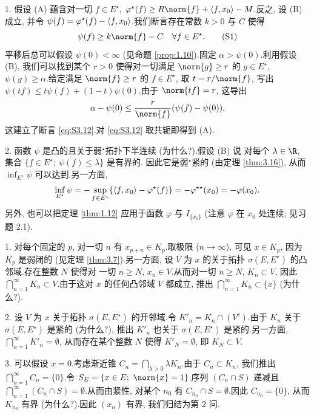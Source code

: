 
1. 假设 (A) 蕴含对一切 $f\in E^\star$,
$\varphi^\star(f)\ge R\norm{f}+\dual{f}{x_0}-M$.反之, 设 (B) 成立, 并令
$\psi(f)=\varphi^\star(f)-\left\langle f,x_0\right\rangle$.我们断言存在常数 $k>0$ 与 $C$ 使得
\begin{equation}
\psi(f)\ge k\norm{f}-C\quad\forall f\in E^\star.
\tag{S1}
\label{eq:S3.12}
\end{equation}
平移后总可以假设 $\psi(0)<\infty$ (见命题  \ref{prop:1.10}).固定
$\alpha>\psi(0)$.利用假设 (B), 我们可以找到某个 $r>0$ 使得对一切满足
$\norm{g}\ge r$ 的 $g\in E^\star$, $\psi(g)\ge\alpha$.给定满足
$\norm{f}\ge r$ 的 $f\in E^\star$, 取 $t=r/\norm{f}$, 写出
$\psi(tf)\le t\psi(f)+(1-t)\psi(0)$.由于 $\norm{tf}=r$, 这导出
\begin{equation*}
\alpha-\psi(0)\le\frac{r}{\norm{f}}(\psi(f)-\psi(0)),
\end{equation*}
这建立了断言 \eqref{eq:S3.12}.对 \eqref{eq:S3.12} 取共轭即得到 (A).

2. 函数 $\psi$ 是凸的且关于弱$^\star$拓扑下半连续 (为什么?).假设 (B) 说
对每个 $\lambda\in\R$, 集合 $\{f\in E^\star;\ \psi(f)\le\lambda\}$ 是有界的.
因此它是弱$^\star$紧的 (由定理  \ref{thm:3.16}), 从而 $\inf_{E^\star}\psi$
可以达到.另一方面,
\begin{equation*}
\inf_{E^\star}\psi=-\sup_{f\in E^\star}\{\left\langle f,x_0\right\rangle-\varphi^\star(f)\}
=-\varphi^{\star\star}(x_0)=-\varphi(x_0).
\end{equation*}
另外, 也可以把定理  \ref{thm:1.12} 应用于函数 $\varphi$ 与 $I_{\{x_0\}}$
(注意 $\varphi$ 在 $x_0$ 处连续; 见习题 2.1).


1. 对每个固定的 $p$, 对一切 $n$ 有 $x_{p+n}\in K_p$.取极限 ($n\to\infty$),
可见 $x\in K_p$, 因为 $K_p$ 是弱闭的 (见定理  \ref{thm:3.7}).另一方面, 设
$V$ 为 $x$ 的关于拓扑 $\sigma(E,E^\star)$ 的凸邻域.存在整数 $N$ 使得对
一切 $n\ge N$, $x_n\in V$.从而对一切 $n\ge N$, $K_n\subset V$, 因此
$\bigcap_{n=1}^\infty K_n\subset V$.由于这对 $x$ 的任何凸邻域 $V$ 都成立,
推出 $\bigcap_{n=1}^\infty K_n\subset\{x\}$ (为什么?).

2. 设 $V$ 为 $x$ 关于拓扑 $\sigma(E,E^\star)$ 的开邻域.令
$K'_n=K_n\cap(V^c)$.由于 $K_n$ 关于 $\sigma(E,E^\star)$ 是紧的 (为什么?),
推出 $K'_n$ 也关于 $\sigma(E,E^\star)$ 是紧的.另一方面,
$\bigcap_{n=1}^\infty K'_n=\emptyset$, 从而存在某个整数 $N$ 使得
$K'_N=\emptyset$, 即 $K_N\subset V$.

3. 可以假设 $x=0$.考虑渐近锥 $C_n=\bigcap_{\lambda>0}\lambda K_n$.由于
$C_n\subset K_n$, 我们推出 $\bigcap_{n=1}^\infty C_n=\{0\}$.令
$S_E=\{x\in E;\ \norm{x}=1\}$.序列 $(C_n\cap S)$ 递减且
$\bigcap_{n=1}^\infty(C_n\cap S)=\emptyset$.从而由紧性, 对某个 $n_0$ 有
$C_{n_0}\cap S=\emptyset$.因此 $C_{n_0}=\{0\}$, 从而 $K_{n_0}$ 有界
(为什么?).因此 $(x_n)$ 有界, 我们归结为第 2 问.

